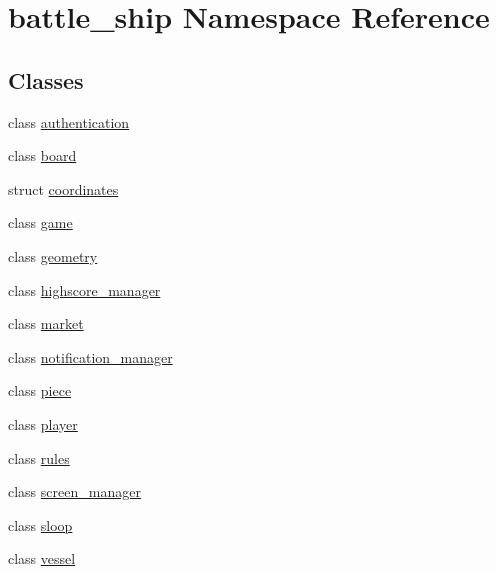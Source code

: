 \hypertarget{namespacebattle__ship}{}\section{battle\+\_\+ship Namespace Reference}
\label{namespacebattle__ship}
\subsection*{Classes}
\begin{DoxyCompactItemize}
\item 
class \hyperlink{classbattle__ship_1_1authentication}{authentication}
\item 
class \hyperlink{classbattle__ship_1_1board}{board}
\item 
struct \hyperlink{structbattle__ship_1_1coordinates}{coordinates}
\item 
class \hyperlink{classbattle__ship_1_1game}{game}
\item 
class \hyperlink{classbattle__ship_1_1geometry}{geometry}
\item 
class \hyperlink{classbattle__ship_1_1highscore__manager}{highscore\+\_\+manager}
\item 
class \hyperlink{classbattle__ship_1_1market}{market}
\item 
class \hyperlink{classbattle__ship_1_1notification__manager}{notification\+\_\+manager}
\item 
class \hyperlink{classbattle__ship_1_1piece}{piece}
\item 
class \hyperlink{classbattle__ship_1_1player}{player}
\item 
class \hyperlink{classbattle__ship_1_1rules}{rules}
\item 
class \hyperlink{classbattle__ship_1_1screen__manager}{screen\+\_\+manager}
\item 
class \hyperlink{classbattle__ship_1_1sloop}{sloop}
\item 
class \hyperlink{classbattle__ship_1_1vessel}{vessel}
\end{DoxyCompactItemize}
